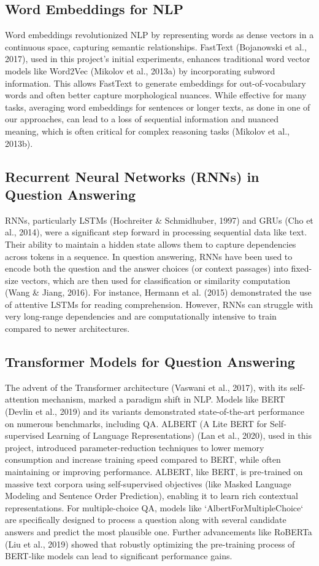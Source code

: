 \documentclass[10.5pt]{article}
\begin{document}
\subsection{Word Embeddings for NLP}
Word embeddings revolutionized NLP by representing words as dense vectors in a continuous space, capturing semantic relationships. FastText (Bojanowski et al., 2017), used in this project's initial experiments, enhances traditional word vector models like Word2Vec (Mikolov et al., 2013a) by incorporating subword information. This allows FastText to generate embeddings for out-of-vocabulary words and often better capture morphological nuances. While effective for many tasks, averaging word embeddings for sentences or longer texts, as done in one of our approaches, can lead to a loss of sequential information and nuanced meaning, which is often critical for complex reasoning tasks (Mikolov et al., 2013b).

\subsection{Recurrent Neural Networks (RNNs) in Question Answering}
RNNs, particularly LSTMs (Hochreiter \& Schmidhuber, 1997) and GRUs (Cho et al., 2014), were a significant step forward in processing sequential data like text. Their ability to maintain a hidden state allows them to capture dependencies across tokens in a sequence. In question answering, RNNs have been used to encode both the question and the answer choices (or context passages) into fixed-size vectors, which are then used for classification or similarity computation (Wang \& Jiang, 2016). For instance, Hermann et al. (2015) demonstrated the use of attentive LSTMs for reading comprehension. However, RNNs can struggle with very long-range dependencies and are computationally intensive to train compared to newer architectures.

\subsection{Transformer Models for Question Answering}
The advent of the Transformer architecture (Vaswani et al., 2017), with its self-attention mechanism, marked a paradigm shift in NLP. Models like BERT (Devlin et al., 2019) and its variants demonstrated state-of-the-art performance on numerous benchmarks, including QA. ALBERT (A Lite BERT for Self-supervised Learning of Language Representations) (Lan et al., 2020), used in this project, introduced parameter-reduction techniques to lower memory consumption and increase training speed compared to BERT, while often maintaining or improving performance. ALBERT, like BERT, is pre-trained on massive text corpora using self-supervised objectives (like Masked Language Modeling and Sentence Order Prediction), enabling it to learn rich contextual representations. For multiple-choice QA, models like `AlbertForMultipleChoice` are specifically designed to process a question along with several candidate answers and predict the most plausible one. Further advancements like RoBERTa (Liu et al., 2019) showed that robustly optimizing the pre-training process of BERT-like models can lead to significant performance gains.
\end{document}
